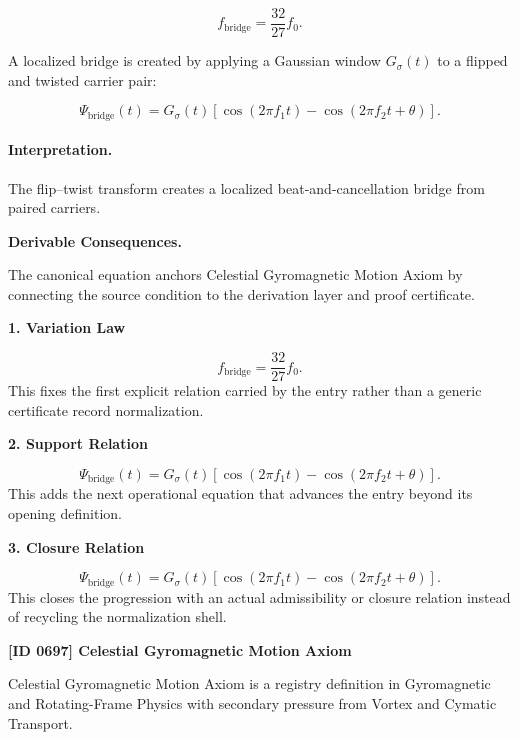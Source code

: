 \begin{equation}
f_{\mathrm{bridge}}=\frac{32}{27}f_0.
\end{equation}

A localized bridge is created by applying a Gaussian window $G_\sigma(t)$ to a flipped and twisted carrier pair:

\begin{equation}
\boxed{
\Psi_{\mathrm{bridge}}(t)
=
G_{\sigma}(t)
\left[
\cos(2\pi f_1t)
-
\cos(2\pi f_2t+\theta)
\right].
}
\end{equation}

\paragraph{Interpretation.}
The flip--twist transform creates a localized beat-and-cancellation bridge from paired carriers.

\par\vspace{0.35em}
\noindent\textbf{Derivable Consequences.}\quad
\begingroup
\footnotesize
\raggedright
The canonical equation anchors Celestial Gyromagnetic Motion Axiom by connecting the source condition to the derivation layer and proof certificate.
\par\endgroup

\noindent\textbf{1. Variation Law}\par
\[
f_{\mathrm{bridge}}=\frac{32}{27}f_0.
\]
\noindent This fixes the first explicit relation carried by the entry rather than a generic certificate record normalization.\par
\noindent\textbf{2. Support Relation}\par
\[
\Psi_{\mathrm{bridge}}(t) = G_{\sigma}(t) \left[ \cos(2\pi f_1t) - \cos(2\pi f_2t+\theta) \right].
\]
\noindent This adds the next operational equation that advances the entry beyond its opening definition.\par
\noindent\textbf{3. Closure Relation}\par
\[
\boxed{ \Psi_{\mathrm{bridge}}(t) = G_{\sigma}(t) \left[ \cos(2\pi f_1t) - \cos(2\pi f_2t+\theta) \right]. }
\]
\noindent This closes the progression with an actual admissibility or closure relation instead of recycling the normalization shell.\par

\clearpage
\noindent\textbf{[ID 0697] Celestial Gyromagnetic Motion Axiom}\par
\vspace{0.35em}
\begingroup\small
{}
Celestial Gyromagnetic Motion Axiom is a registry definition in Gyromagnetic and Rotating-Frame Physics with secondary pressure from Vortex and Cymatic Transport.

